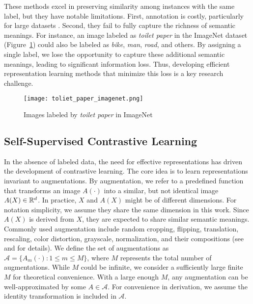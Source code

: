 These methods excel in preserving similarity among instances with the same label, but they have notable limitations. First, annotation is costly, particularly for large datasets \citep{albelwi2022survey}. Second, they fail to fully capture the richness of semantic meanings. For instance, an image labeled as \textit{toilet paper} in the ImageNet dataset (Figure~\ref{fig: toilet paper imagenet}) could also be labeled as \textit{bike}, \textit{man}, \textit{road}, and others. By assigning a single label, we lose the opportunity to capture these additional semantic meanings, leading to significant information loss. Thus, developing efficient representation learning methods that minimize this loss is a key research challenge.
\begin{figure}[h]
    \centering
    \texttt{[image: toliet\_paper\_imagenet.png]}
    \caption{Images labeled by \textit{toilet paper} in ImageNet}
    \label{fig: toilet paper imagenet}
\end{figure}

\subsection{Self-Supervised Contrastive Learning}\label{subsection: self-supervised contrastive learning}
In the absence of labeled data, the need for effective representations has driven the development of contrastive learning. The core idea is to learn representations invariant to augmentations. By augmentation, we refer to a predefined function that transforms an image $A(\cdot)$ into a similar, but not identical image $A(X) \in \mathbb{R}^{d}$. In practice, $X$ and $A(X)$ might be of different dimensions. For notation simplicity, we assume they share the same dimension in this work. Since $A(X)$ is derived from $X$, they are expected to share similar semantic meanings. Commonly used augmentation include random cropping, flipping, translation, rescaling, color distortion, grayscale, normalization, and their compositions (see \citet{chen2020simclr} and \citet{wang2024comprehensive} for details). We define the set of augmentations as $\mathcal{A} = \{A_{m}(\cdot): 1\leq m \leq M\}$, where $M$ represents the total number of augmentations. While $M$ could be infinite, we consider a sufficiently large finite $M$ for theoretical convenience. With a large enough $M$, any augmentation can be well-approximated by some $A \in \mathcal{A}$. For convenience in derivation, we assume the identity transformation is included in $\mathcal{A}$.

